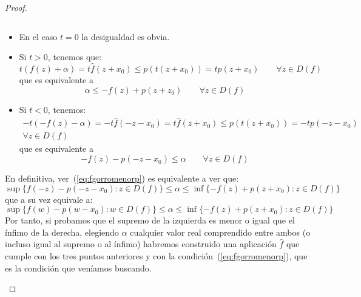 \begin{teo}
\begin{proof}
\begin{itemize}
\begin{equation*}
                \end{equation*}
                \begin{itemize}
                    \item En el caso $t=0$ la desigualdad es obvia.
                    \item Si $t>0$, tenemos que:
                        \begin{equation*}
                            t(f(z) + \alpha) = t\hat{f}(z+x_0) \leq p(t(z+x_0)) = tp(z+x_0)  \qquad \forall z\in D(f)
                        \end{equation*}
                        que es equivalente a
                        \begin{equation*}
                            \alpha \leq -f(z) + p(z+z_0) \qquad \forall z \in D(f)
                        \end{equation*}
                    \item Si $t<0$, tenemos:
                        \begin{multline*}
                            -t(-f(z)-\alpha) = -t\hat{f}(-z-x_0) = t\hat{f}(z+x_0) \leq p(t(z+x_0)) = -tp(-z-x_0) \\ \forall z\in D(f)
                        \end{multline*}
                        que es equivalente a
                        \begin{equation*}
                            -f(z) - p(-z-x_0) \leq \alpha \qquad \forall z\in D(f)
                        \end{equation*}
                \end{itemize}
                En definitiva, ver~(\ref{eq:fgorromenorp}) es equivalente a ver que:
                \begin{equation*}
                    \sup\{f(-z)-p(-z-x_0) : z\in D(f)\} \leq \alpha \leq \inf\{-f(z)+p(z+x_0) : z\in D(f)\}
                \end{equation*}
                que a su vez equivale a:
                \begin{equation*}
                    \sup\{f(w)-p(w-x_0) : w\in D(f)\} \leq \alpha \leq \inf\{-f(z)+p(z+x_0) : z\in D(f)\}
                \end{equation*}
                Por tanto, si probamos que el supremo de la izquierda es menor o igual que el ínfimo de la derecha, elegiendo $\alpha$ cualquier valor real comprendido entre ambos (o incluso igual al supremo o al ínfimo) habremos construido una aplicación $\hat{f}$ que cumple con los tres puntos anteriores y con la condición~(\ref{eq:fgorromenorp}), que es la condición que veníamos buscando.


\end{itemize}
\end{proof}
\end{teo}
